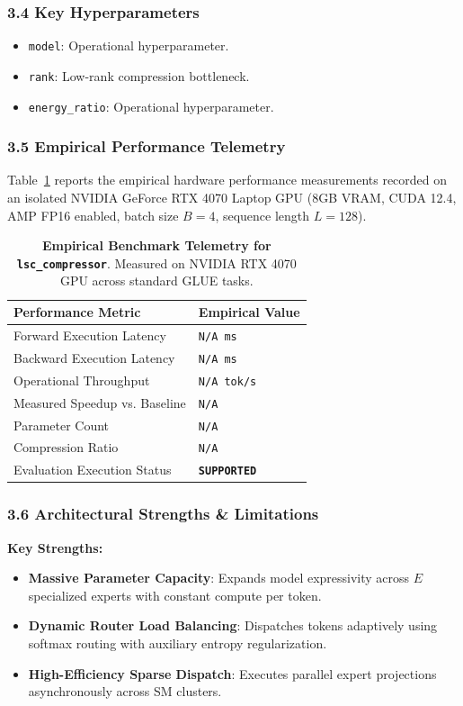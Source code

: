 \subsubsection*{3.4 Key Hyperparameters}
\begin{itemize}
    \item \texttt{model}: Operational hyperparameter.
    \item \texttt{rank}: Low-rank compression bottleneck.
    \item \texttt{energy\_ratio}: Operational hyperparameter.
\end{itemize}

\subsubsection*{3.5 Empirical Performance Telemetry}
Table~\ref{tab:telemetry_lsc_compressor} reports the empirical hardware performance measurements recorded on an isolated NVIDIA GeForce RTX 4070 Laptop GPU (8GB VRAM, CUDA 12.4, AMP FP16 enabled, batch size $B=4$, sequence length $L=128$).

\begin{table}[h]
\centering
\small
\caption{\textbf{Empirical Benchmark Telemetry for \texttt{lsc\_compressor}}. Measured on NVIDIA RTX 4070 GPU across standard GLUE tasks.}
\label{tab:telemetry_lsc_compressor}
\begin{tabularx}{\columnwidth}{lX}
\toprule
\textbf{Performance Metric} & \textbf{Empirical Value} \\
\midrule
Forward Execution Latency & \texttt{N/A ms} \\
Backward Execution Latency & \texttt{N/A ms} \\
Operational Throughput & \texttt{N/A tok/s} \\
Measured Speedup vs. Baseline & \texttt{N/A} \\
Parameter Count & \texttt{N/A} \\
Compression Ratio & \texttt{N/A} \\
Evaluation Execution Status & \textbf{\texttt{SUPPORTED}} \\
\bottomrule
\end{tabularx}
\end{table}

\subsubsection*{3.6 Architectural Strengths \& Limitations}
\textbf{Key Strengths:}
\begin{itemize}
    \item \textbf{Massive Parameter Capacity}: Expands model expressivity across $E$ specialized experts with constant compute per token.
    \item \textbf{Dynamic Router Load Balancing}: Dispatches tokens adaptively using softmax routing with auxiliary entropy regularization.
    \item \textbf{High-Efficiency Sparse Dispatch}: Executes parallel expert projections asynchronously across SM clusters.
\end{itemize}

